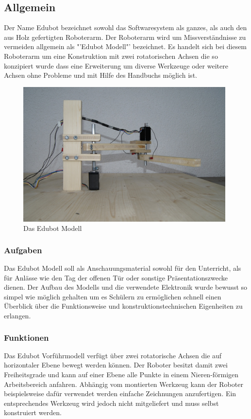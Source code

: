 \subsection{Allgemein}            
Der Name Edubot bezeichnet sowohl das Softwaresystem als ganzes, als auch den aus Holz gefertigten Roboterarm. Der Roboterarm wird um Missverständnisse zu vermeiden allgemein als "'Edubot Modell"' bezeichnet. Es handelt sich bei diesem Roboterarm um eine Konstruktion mit zwei rotatorischen Achsen die so konzipiert wurde dass eine Erweiterung um diverse Werkzeuge oder weitere Achsen ohne Probleme und mit Hilfe des Handbuchs möglich ist. 

\begin{figure}[H]
  \centering
  \begin{minipage}[t]{11 cm}
  	\centering
  	\includegraphics[width=11cm]{images/edubot_photo} 
    \caption{Das Edubot Modell}
  \end{minipage}
\end{figure}

\subsubsection{Aufgaben}
Das Edubot Modell soll als Anschauungsmaterial sowohl für den Unterricht, als für Anlässe wie den Tag der offenen Tür oder sonstige Präsentationszwecke dienen. Der Aufbau des Modells und die verwendete Elektronik wurde bewusst so simpel wie möglich gehalten um es Schülern zu ermöglichen schnell einen Überblick über die Funktionsweise und konstruktionstechnischen Eigenheiten zu erlangen.

\subsubsection{Funktionen}
Das Edubot Vorführmodell verfügt über zwei rotatorische Achsen die auf horizontaler Ebene bewegt werden können. 
Der Roboter besitzt damit zwei Freiheitsgrade und kann auf einer Ebene alle Punkte in einem Nieren-förmigen Arbeitsbereich anfahren. Abhängig vom montierten Werkzeug kann der Roboter beispielsweise dafür verwendet werden einfache Zeichnungen anzufertigen. Ein entsprechendes Werkzeug wird jedoch nicht mitgeliefert und muss selbst konstruiert werden.

